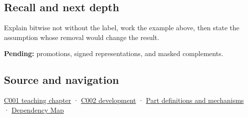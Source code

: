\subsection{Recall and next depth}\label{appendix-8f38927cfc54-recall-and-next-depth}

Explain bitwise not without the label, work the example above, then state the assumption whose removal would change the result.

\textbf{Pending:} promotions, signed representations, and masked complements.

\subsection{Source and navigation}\label{appendix-8f38927cfc54-source-and-navigation}

\hyperref[01-foundations-i-ch001-from-a-signal-to-an-interpretation]{C001 teaching chapter} · \hyperref[01-foundations-i-ch001-arithmetic-becomes-a-policy]{C002 development} · \hyperref[appendix-fd090d982a15]{Part definitions and mechanisms} · \hyperref[appendix-4ad47bdd269a]{Dependency Map}
